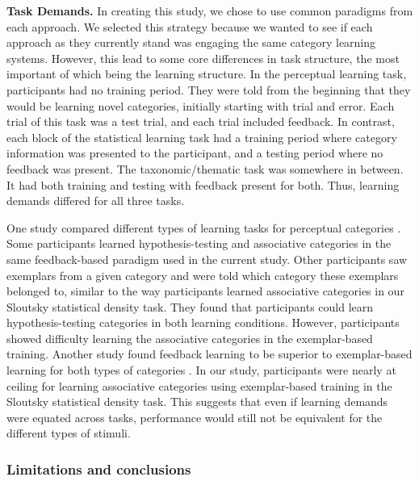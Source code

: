 \documentclass[../dissertation.tex]{subfiles}
\begin{document}
\textbf{Task Demands.} In creating this study, we chose to use common paradigms from each approach. We selected this strategy because we wanted to see if each approach as they currently stand was engaging the same category learning systems. However, this lead to some core differences in task structure, the most important of which being the learning structure. In the perceptual learning task, participants had no training period. They were told from the beginning that they would be learning novel categories, initially starting with trial and error. Each trial of this task was a test trial, and each trial included feedback. In contrast, each block of the statistical learning task had a training period where category information was presented to the participant, and a testing period where no feedback was present. The taxonomic/thematic task was somewhere in between. It had both training and testing with feedback present for both. Thus, learning demands differed for all three tasks. \par 
One study compared different types of learning tasks for perceptual categories \citep{Ashby2002}. Some participants learned hypothesis-testing and associative categories in the same feedback-based paradigm used in the current study. Other participants saw exemplars from a given category and were told which category these exemplars belonged to, similar to the way participants learned associative categories in our Sloutsky statistical density task. They found that participants could learn hypothesis-testing categories in both learning conditions. However, participants showed difficulty learning the associative categories in the exemplar-based training. Another study found feedback learning to be superior to exemplar-based learning for both types of categories \citep{Edmunds2015}. In our study, participants were nearly at ceiling for learning associative categories using exemplar-based training in the Sloutsky statistical density task. This suggests that even if learning demands were equated across tasks, performance would still not be equivalent for the different types of stimuli.
	
\subsubsection{Limitations and conclusions}
\end{document}
